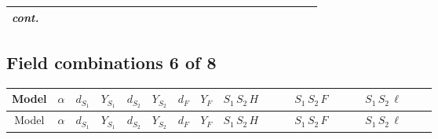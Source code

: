 \documentclass[8pt]{article}
\begin{document}
\begin{landscape}
\begin{longtable}{@{}cccccccc >{\raggedright\arraybackslash}p{0.21\linewidth} >{\raggedright\arraybackslash}p{0.21\linewidth} >{\raggedright\arraybackslash}p{0.21\linewidth}@{}}
\textit{cont.} &  &  &  &  &  &  &  &  &  & \scriptsize\adjustbox{max width=\linewidth}{$\begin{gathered} +\frac{\sqrt{3} \hbar  \overline{y_{2,i_1,r_1}} \overline{Y_{e,i_3,i_2}} \overline{e_{i_2}}\, P_L\, L_{a_1,i_1} y_{2,i_3,r_1} H_{a_1}{}^{\dagger }}{4 \epsilon } \\ +\frac{3}{8} \sqrt{3} \hbar  \overline{y_{2,i_1,r_1}} \overline{Y_{e,i_3,i_2}} \overline{e_{i_2}}\, P_L\, L_{a_1,i_1} y_{2,i_3,r_1} H_{a_1}{}^{\dagger }\end{gathered}$} \\
\midrule
\bottomrule
\end{longtable}
\clearpage
\subsection*{Field combinations 6 of 8}
\begin{longtable}{@{}cccccccc >{\raggedright\arraybackslash}p{0.21\linewidth} >{\raggedright\arraybackslash}p{0.21\linewidth} >{\raggedright\arraybackslash}p{0.21\linewidth}@{}}
\toprule
Model & $\alpha$ & $d_{S_1}$ & $Y_{S_1}$ & $d_{S_2}$ & $Y_{S_2}$ & $d_F$ & $Y_F$ & $S_1\,S_2\,H$ & $S_1\,S_2\,F$ & $S_1\,S_2\,\ell$ \\
\midrule
\endfirsthead
\toprule
Model & $\alpha$ & $d_{S_1}$ & $Y_{S_1}$ & $d_{S_2}$ & $Y_{S_2}$ & $d_F$ & $Y_F$ & $S_1\,S_2\,H$ & $S_1\,S_2\,F$ & $S_1\,S_2\,\ell$ \\
\midrule
\endhead

\end{longtable}
\end{landscape}
\end{document}
